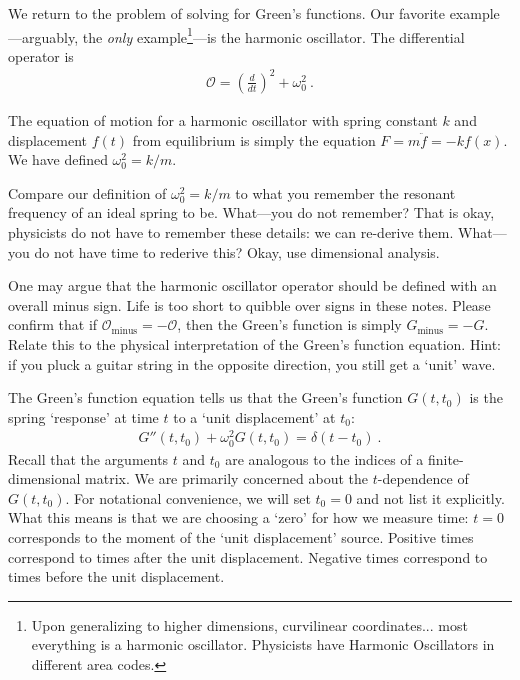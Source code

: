 We return to the problem of solving for Green's functions. Our favorite example---arguably, the \emph{only} example\footnote{Upon generalizing to higher dimensions, curvilinear coordinates... most everything is a harmonic oscillator. Physicists have Harmonic Oscillators in different area codes.}---is the harmonic oscillator. The differential operator is
\begin{align}
  \mathcal O = \left(\frac{d}{dt}\right)^2 + \omega_0^2 \ .
  \label{eq:O:HO}
\end{align}
\begin{example}
The equation of motion for a harmonic oscillator with spring constant $k$ and displacement $f(t)$ from equilibrium is simply the equation $F=m\ddot{f} = -k f(x)$. We have defined $\omega_0^2 = k/m$.
\end{example}
\begin{exercise}
Compare our definition of $\omega_0^2 = k/m$ to what you remember the resonant frequency of an ideal spring to be. What---you do not remember? That is okay, physicists do not have to remember these details: we can re-derive them. What---you do not have time to rederive this? Okay, use dimensional analysis. 
\end{exercise}
\begin{exercise}
One may argue that the harmonic oscillator operator should be defined with an overall minus sign. Life is too short to quibble over signs in these notes. Please confirm that if  $\mathcal O_\text{minus} = -\mathcal O$, then the Green's function is simply $G_\text{minus} = - G$. Relate this to the physical interpretation of the Green's function equation. {Hint:} if you pluck a guitar string in the opposite direction, you still get a `unit' wave.
\end{exercise}
The Green's function equation tells us that the Green's function $G(t,t_0)$ is the spring `response' at time $t$ to a `unit displacement' at $t_0$:
\begin{align}
  G''(t,t_0) + \omega_0^2 G(t,t_0) = \delta(t-t_0) \ .
  \label{eq:HO:Greens:eqn}
\end{align}
Recall that the arguments $t$ and $t_0$ are analogous to the indices of a finite-dimensional matrix. We are primarily concerned about the $t$-dependence of $G(t,t_0)$.  For notational convenience, we will set $t_0=0$ and not list it explicitly. What this means is that we are choosing a `zero' for how we measure time: $t=0$ corresponds to the moment of the `unit displacement' source. Positive times correspond to times after the unit displacement. Negative times correspond to times before the unit displacement.

